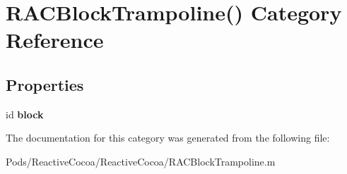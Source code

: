 \hypertarget{category_r_a_c_block_trampoline_07_08}{}\section{R\+A\+C\+Block\+Trampoline() Category Reference}
\label{category_r_a_c_block_trampoline_07_08}
\subsection*{Properties}
\begin{DoxyCompactItemize}
\item 
\mbox{\label{category_r_a_c_block_trampoline_07_08_a049be49fe772b57a5b9d4dfab25cf597}} 
id {\bfseries block}
\end{DoxyCompactItemize}


The documentation for this category was generated from the following file\+:\begin{DoxyCompactItemize}
\item 
Pods/\+Reactive\+Cocoa/\+Reactive\+Cocoa/R\+A\+C\+Block\+Trampoline.\+m\end{DoxyCompactItemize}
